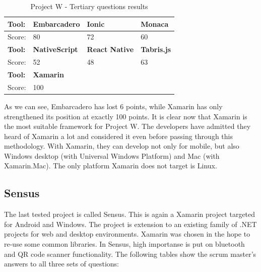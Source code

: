 \documentclass[english,master,public,dept460,male,cpdeclaration,oneside]{diploma}
\begin{document}
\begin{table}[!h]
	\centering
	\caption{Project W - Tertiary questions results}
	\begin{tabular}{p{4cm} | p{3cm} | p{3cm} | p{3cm}}
		\toprule		
		\textbf{Tool:} & \textbf{Embarcadero} & \textbf{Ionic} & \textbf{Monaca} \\ 
		\midrule
		Score: & 80 & 72 & 60 \\ 
		\midrule
		\textbf{Tool:} & \textbf{NativeScript} & \textbf{React Native} & \textbf{Tabris.js} \\
		\midrule
		Score: & 52 & 48 & 63 \\
		\midrule
		\textbf{Tool:}& \textbf{Xamarin} & & \\	
		\midrule
		Score: & 100 & & \\	
		\midrule
	\end{tabular}
\end{table}

As we can see, Embarcadero has lost 6 points, while Xamarin has only strengthened its position at exactly 100 points. It is clear now that Xamarin is the most suitable framework for Project W. The developers have admitted they heard of Xamarin a lot and considered it even before passing through this methodology. With Xamarin, they can develop not only for mobile, but also Windows desktop (with Universal Windows Platform) and Mac (with Xamarin.Mac). The only platform Xamarin does not target is Linux.

\subsection{Sensus}

The last tested project is called Sensus. This is again a Xamarin project targeted for Android and Windows. The project is extension to an existing family of .NET projects for web and desktop environments. Xamarin was chosen in the hope to re-use some common libraries. In Sensus, high importanse is put on bluetooth and QR code scanner functionality. The following tables show the scrum master's answers to all three sets of questions:
\end{document}
